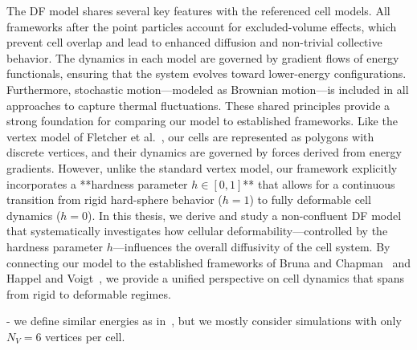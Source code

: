 The DF model shares several key features with the referenced cell models. 
All frameworks after the point particles account for excluded-volume effects, which prevent cell overlap and lead to enhanced diffusion and non-trivial collective behavior. 
The dynamics in each model are governed by gradient flows of energy functionals, ensuring that the system evolves toward lower-energy configurations. 
Furthermore, stochastic motion—modeled as Brownian motion—is included in all approaches to capture thermal fluctuations. 
These shared principles provide a strong foundation for comparing our model to established frameworks.
Like the vertex model of Fletcher et al.~\cite{Fletcher14}, our cells are represented as polygons with discrete vertices, and their dynamics are governed by forces derived from energy gradients. 
However, unlike the standard vertex model, our framework explicitly incorporates a **hardness parameter $h \in [0,1]$** that allows for a continuous transition from rigid hard-sphere behavior ($h=1$) to fully deformable cell dynamics ($h=0$).
In this thesis, we derive and study a non-confluent DF model that systematically investigates how cellular deformability—controlled by the hardness parameter $h$—influences the overall diffusivity of the cell system. 
By connecting our model to the established frameworks of Bruna and Chapman~\cite{Bruna2012, Bruna2017} and Happel and Voigt~\cite{Happel2023}, we provide a unified perspective on cell dynamics that spans from rigid to deformable regimes.




- we define similar energies as in~\cite{Fletcher14}, but we mostly consider simulations with only $N_V=6$ vertices per cell.  


